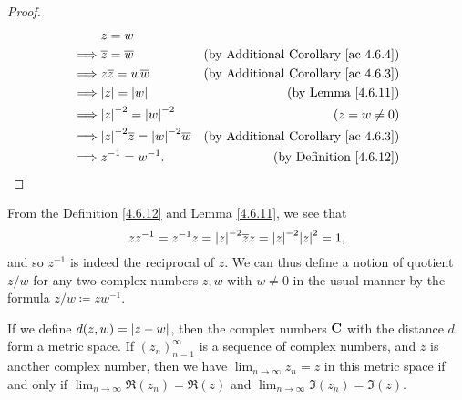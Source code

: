 \begin{proof}
    \begin{align*}
                 & z = w                                                                                                   \\
        \implies & \overline{z} = \overline{w}                           & \text{(by Additional Corollary \ref{ac 4.6.4})} \\
        \implies & z \overline{z} = w \overline{w}                       & \text{(by Additional Corollary \ref{ac 4.6.3})} \\
        \implies & \abs{z} = \abs{w}                                     & \text{(by Lemma \ref{4.6.11})}                  \\
        \implies & \abs{z}^{-2} = \abs{w}^{-2}                           & (z = w \neq 0)                                  \\
        \implies & \abs{z}^{-2} \overline{z} = \abs{w}^{-2} \overline{w} & \text{(by Additional Corollary \ref{ac 4.6.3})} \\
        \implies & z^{-1} = w^{-1}.                                      & \text{(by Definition \ref{4.6.12})}
    \end{align*}
\end{proof}

\begin{note}
    From the Definition \ref{4.6.12} and Lemma \ref{4.6.11}, we see that
    \[
        z z^{-1} = z^{-1} z = \abs{z}^{-2} \overline{z} z = \abs{z}^{-2} \abs{z}^2 = 1,
    \]
    and so \(z^{-1}\) is indeed the reciprocal of \(z\).
    We can thus define a notion of quotient \(z / w\) for any two complex numbers \(z, w\) with \(w \neq 0\) in the usual manner by the formula \(z / w \coloneqq z w^{-1}\).
\end{note}

\begin{lemma}\label{4.6.13}
    If we define \(d(z, w) = \left\lvert z - w\right\rvert\), then the complex numbers \(\mathbf{C}\) with the distance \(d\) form a metric space.
    If \((z_n)_{n = 1}^\infty\) is a sequence of complex numbers, and \(z\) is another complex number, then we have \(\lim_{n \to \infty} z_n = z\) in this metric space if and only if \(\lim_{n \to \infty} \Re(z_n) = \Re(z)\) and \(\lim_{n \to \infty} \Im(z_n) = \Im(z)\).
\end{lemma}

